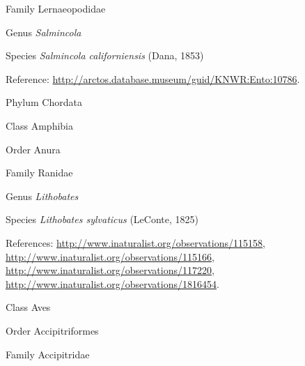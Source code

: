 \documentclass[9pt, article]{memoir}
\begin{document}
\begin{multicols}{2}
\vspace{6pt}\noindent\hspace{24pt}Family Lernaeopodidae


\vspace{6pt}\noindent\hspace{30pt}Genus \textit{Salmincola}


\vspace{6pt}\noindent\hspace{36pt}Species \textit{Salmincola californiensis} (Dana, 1853)


\vspace{6pt}Reference: 
\url{http://arctos.database.museum/guid/KNWR:Ento:10786}.

\vspace{6pt}\noindent\hspace{6pt}Phylum Chordata


\vspace{6pt}\noindent\hspace{12pt}Class Amphibia


\vspace{6pt}\noindent\hspace{18pt}Order Anura


\vspace{6pt}\noindent\hspace{24pt}Family Ranidae


\vspace{6pt}\noindent\hspace{30pt}Genus \textit{Lithobates}


\vspace{6pt}\noindent\hspace{36pt}Species \textit{Lithobates sylvaticus} (LeConte, 1825)


\vspace{6pt}References: 
\url{http://www.inaturalist.org/observations/115158}, 
\url{http://www.inaturalist.org/observations/115166}, 
\url{http://www.inaturalist.org/observations/117220}, 
\url{http://www.inaturalist.org/observations/1816454}.

\vspace{6pt}\noindent\hspace{12pt}Class Aves


\vspace{6pt}\noindent\hspace{18pt}Order Accipitriformes


\vspace{6pt}\noindent\hspace{24pt}Family Accipitridae



\end{multicols}
\end{document}
